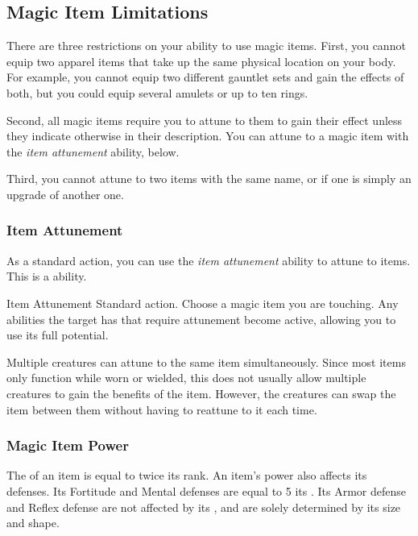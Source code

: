 
  \subsection{Magic Item Limitations}

    There are three restrictions on your ability to use magic items.
    First, you cannot equip two apparel items that take up the same physical location on your body.
    For example, you cannot equip two different gauntlet sets and gain the effects of both, but you could equip several amulets or up to ten rings.

    Second, all magic items require you to attune to them to gain their effect unless they indicate otherwise in their description.
    You can attune to a magic item with the \textit{item attunement} ability, below.

    Third, you cannot attune to two items with the same name, or if one is simply an upgrade of another one.

    \subsubsection{Item Attunement}\label{Item Attunement}

      As a standard action, you can use the \textit{item attunement} ability to attune to items.
      This is a \magical ability.

      \begin{attuneability}{Item Attunement}{}
        \abilityusagetime Standard action.
        \rankline
        Choose a magic item you are touching.
        Any abilities the target has that require attunement become active, allowing you to use its full potential.
      \end{attuneability}

       Multiple creatures can attune to the same item simultaneously.
      Since most items only function while worn or wielded, this does not usually allow multiple creatures to gain the benefits of the item.
      However, the creatures can swap the item between them without having to reattune to it each time.

    \subsubsection{Magic Item Power}\label{Magic Item Power}
      The  of an item is equal to twice its rank.
      An item's power also affects its defenses.
      Its Fortitude and Mental defenses are equal to 5 \add its .
      Its Armor defense and Reflex defense are not affected by its , and are solely determined by its size and shape.

